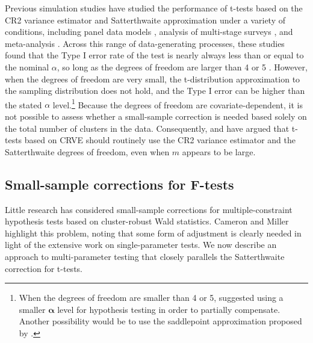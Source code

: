 \documentclass[12pt]{article}\usepackage[]{graphicx}\usepackage[]{color}
\newcommand{\bs}{\boldsymbol}
\begin{document}
Previous simulation studies have studied the performance of t-tests based on the CR2 variance estimator and Satterthwaite approximation under a variety of conditions, including panel data models \citep{Cameron2015practitioners, Imbens2015robust}, analysis of multi-stage surveys \citep{Bell2002bias}, and meta-analysis . Across this range of data-generating processes, these studies found that the Type I error rate of the test is nearly always less than or equal to the nominal $\alpha$, so long as the degrees of freedom are larger than 4 or 5 \citep[][]{Bell2002bias}.
However, when the degrees of freedom are very small, the t-distribution approximation to the sampling distribution does not hold, and the Type I error can be higher than the stated $\alpha$ level.\footnote{When the degrees of freedom are smaller than 4 or 5,  suggested using a smaller $\bs\alpha$ level for hypothesis testing in order to partially compensate. Another possibility would be to use the saddlepoint approximation proposed by \citet{McCaffrey2006improved}.}
Because the degrees of freedom are covariate-dependent, it is not possible to assess whether a small-sample correction is needed based solely on the total number of clusters in the data. 
Consequently,  and \citet{Imbens2015robust} have argued that t-tests based on CRVE should routinely use the CR2 variance estimator and the Satterthwaite degrees of freedom, even when $m$ appears to be large.

\subsection{Small-sample corrections for F-tests}
\label{subsec:F-tests}

Little research has considered small-sample corrections for multiple-constraint hypothesis tests based on cluster-robust Wald statistics.
Cameron and Miller highlight this problem, noting that some form of adjustment is clearly needed in light of the extensive work on single-parameter tests.
We now describe an approach to multi-parameter testing that closely parallels the Satterthwaite correction for t-tests.
\end{document}
